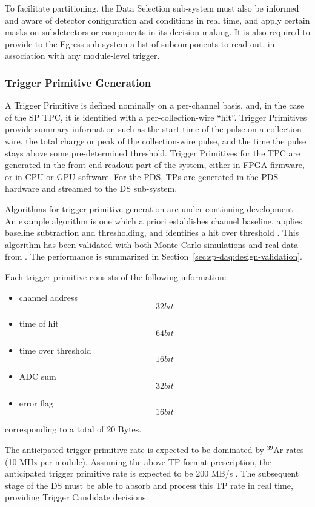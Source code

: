 To facilitate partitioning, the Data Selection sub-system must also be
informed and aware of detector configuration and conditions in real
time, and apply certain masks on subdetectors or components
in its decision making. It is also required to provide to the Egress sub-system a list of
subcomponents to read out, in association
with any module-level trigger.

\subsubsection{Trigger Primitive Generation}
\label{sec:sp-daq:design-trigger-primitives}

A Trigger Primitive is defined nominally on a per-channel basis, and,
in the case of the SP TPC, it is identified with a per-collection-wire
``hit''. Trigger Primitives provide summary information
such as the start time of the pulse on a collection wire, the total
charge or peak of the collection-wire pulse, and the time the pulse
stays above some pre-determined threshold. Trigger Primitives for the
TPC are generated in the front-end readout part of the  
system, either in FPGA firmware, or in CPU or GPU software. For the
PDS, TPs are generated in the PDS hardware and streamed to the 
DS sub-system.

Algorithms for trigger primitive generation are under continuing development
\cite{docid-11275}. An example algorithm is one which a priori establishes
channel baseline, applies baseline subtraction and thresholding, and
identifies a hit over threshold \cite{docid-11236}. This algorithm has been
validated with both Monte Carlo simulations and real data from . The performance is
summarized in Section~\ref{sec:sp-daq:design-validation}.

Each trigger primitive consists of the following information:
\begin{itemize}
\item channel address \[32 bit\]
\item time of hit \[64 bit\]
\item time over threshold \[16 bit\]
\item ADC sum \[32 bit\]
\item error flag \[16 bit\]
\end{itemize}
corresponding to a total of 20 Bytes.

The anticipated trigger primitive rate  is expected to be dominated by
$^{39}$Ar rates (10 MHz per module). Assuming the above TP format
prescription, the anticipated trigger primitive rate is expected to be
200 MB/s . The subsequent stage of the DS must be able to absorb and
process this TP rate in real time, providing Trigger Candidate decisions. 


